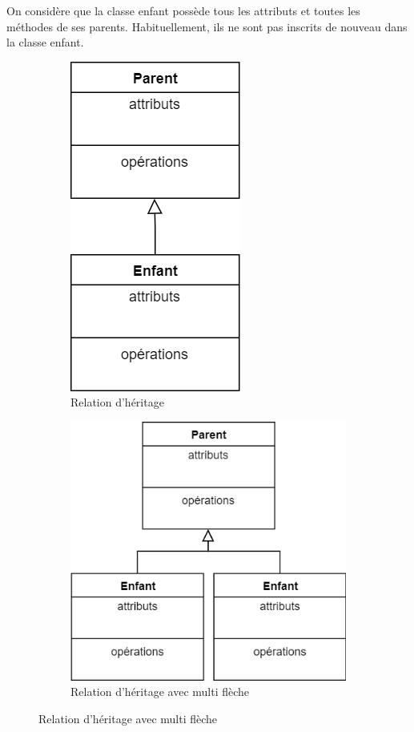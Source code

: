 On considère que la classe enfant possède tous les attributs et toutes les méthodes de ses parents. Habituellement, ils ne sont pas inscrits de nouveau dans la classe enfant.

\begin{figure}[H]
	\caption{Représentation de la relation d'héritage}
	\centering
	\hfill
	\begin{subfigure}[b]{0.35\textwidth}
		\centering
		\includegraphics[scale=0.4]{dcc-heritage-simple.png}
		\caption*{Relation d'héritage}
	\end{subfigure}
	\hfill
	\begin{subfigure}[b]{0.5\textwidth}
		\centering
		\includegraphics[scale=0.4]{dcc-heritage-multi.png}
		\caption*{Relation d'héritage avec multi flèche}
	\end{subfigure}
	\hfill
\end{figure}

